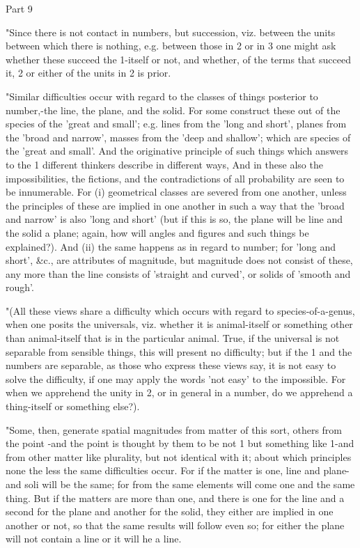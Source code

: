 Part 9 

"Since there is not contact in numbers, but succession, viz. between
the units between which there is nothing, e.g. between those in 2
or in 3 one might ask whether these succeed the 1-itself or not, and
whether, of the terms that succeed it, 2 or either of the units in
2 is prior. 

"Similar difficulties occur with regard to the classes of things posterior
to number,-the line, the plane, and the solid. For some construct
these out of the species of the 'great and small'; e.g. lines from
the 'long and short', planes from the 'broad and narrow', masses from
the 'deep and shallow'; which are species of the 'great and small'.
And the originative principle of such things which answers to the
1 different thinkers describe in different ways, And in these also
the impossibilities, the fictions, and the contradictions of all probability
are seen to be innumerable. For (i) geometrical classes are severed
from one another, unless the principles of these are implied in one
another in such a way that the 'broad and narrow' is also 'long and
short' (but if this is so, the plane will be line and the solid a
plane; again, how will angles and figures and such things be explained?).
And (ii) the same happens as in regard to number; for 'long and short',
&c., are attributes of magnitude, but magnitude does not consist of
these, any more than the line consists of 'straight and curved', or
solids of 'smooth and rough'. 

"(All these views share a difficulty which occurs with regard to species-of-a-genus,
when one posits the universals, viz. whether it is animal-itself or
something other than animal-itself that is in the particular animal.
True, if the universal is not separable from sensible things, this
will present no difficulty; but if the 1 and the numbers are separable,
as those who express these views say, it is not easy to solve the
difficulty, if one may apply the words 'not easy' to the impossible.
For when we apprehend the unity in 2, or in general in a number, do
we apprehend a thing-itself or something else?). 

"Some, then, generate spatial magnitudes from matter of this sort,
others from the point -and the point is thought by them to be not
1 but something like 1-and from other matter like plurality, but not
identical with it; about which principles none the less the same difficulties
occur. For if the matter is one, line and plane-and soli will be the
same; for from the same elements will come one and the same thing.
But if the matters are more than one, and there is one for the line
and a second for the plane and another for the solid, they either
are implied in one another or not, so that the same results will follow
even so; for either the plane will not contain a line or it will he
a line. 

